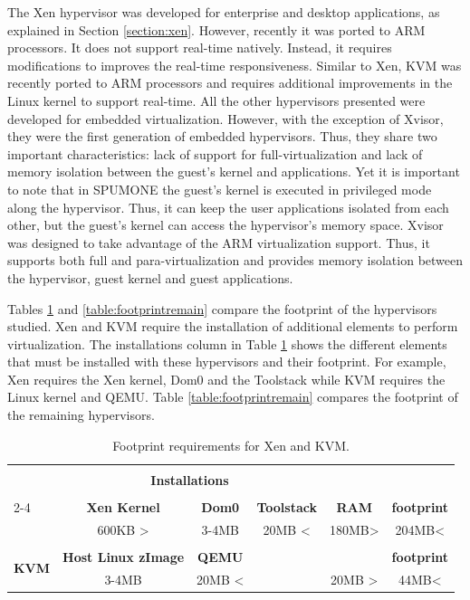 The Xen hypervisor was developed for enterprise and desktop applications, as explained in Section \ref{section:xen}. However, recently it was ported to ARM processors. It does not support real-time natively. Instead, it requires modifications to improves the real-time responsiveness. Similar to Xen, KVM was recently ported to ARM processors and requires additional improvements in the Linux kernel to support real-time. All the other hypervisors presented were developed for embedded virtualization. However, with the exception of Xvisor, they were the first generation of embedded hypervisors. Thus, they share two important characteristics: lack of support for full-virtualization and lack of memory isolation between the guest's kernel and applications. Yet it is important to note that in SPUMONE the guest's kernel is executed in privileged mode along the hypervisor. Thus, it can keep the user applications isolated from each other, but the guest's kernel can access the hypervisor's memory space. Xvisor was designed to take advantage of the ARM virtualization support. Thus, it supports both full and para-virtualization and provides memory isolation between the hypervisor, guest kernel and guest applications. 

Tables \ref{table:footprintXenKvm} and \ref{table:footprintremain} compare the footprint of the hypervisors studied. Xen and KVM require the installation of additional elements to perform virtualization.  The installations column in Table \ref{table:footprintXenKvm} shows the different elements that must be installed with these hypervisors and their footprint. For example, Xen requires the Xen kernel, Dom0 and the Toolstack while KVM requires the Linux kernel and QEMU. Table \ref{table:footprintremain} compares the footprint of the remaining hypervisors.  
 
\begin{table}[!hbtp]
\centering
\caption{Footprint requirements for Xen and KVM.}
\label{table:footprintXenKvm}
\begin{tabular}{lccccc}
\hline \hline \\
                              & \multicolumn{3}{c}{\textbf{Installations}}                                    & \multicolumn{1}{l}{} \\ \\ \cline{2-4}
\multirow{2}{*}{\textbf{Xen}} & \textbf{Xen Kernel}        & \textbf{Dom0} & \textbf{Toolstack}   & \textbf{RAM}  & \textbf{footprint}\\
                              & 600KB \textgreater         & 3-4MB                    & 20MB \textless      & 180MB\textgreater   & 204MB\textless\\ \\\hline
\multirow{2}{*}{\textbf{KVM}} & \textbf{Host Linux zImage} & \textbf{QEMU}             & \multicolumn{1}{l}{} & \multicolumn{1}{l}{} & \textbf{footprint}\\
                              & 3-4MB                     & 20MB \textless           &                      & 20MB \textgreater & 44MB\textless   \\ \hline
\end{tabular}
\end{table}


